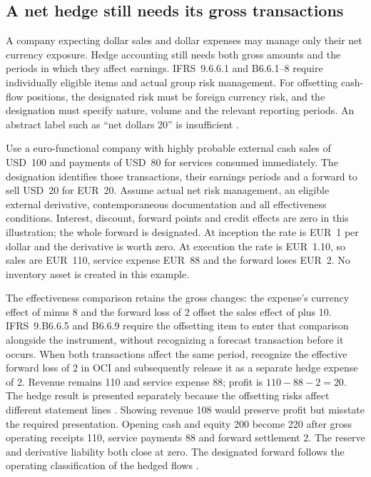 \subsection{A net hedge still needs its gross transactions}
\label{sec:net-hedge-timing}

A company expecting dollar sales and dollar expenses may manage only their
net currency exposure. Hedge accounting still needs both gross amounts and the
periods in which they affect earnings. IFRS~9.6.6.1 and B6.6.1--8 require
individually eligible items and actual group risk management. For offsetting
cash-flow positions, the designated risk must be foreign currency risk, and
the designation must specify nature, volume and the relevant reporting periods.
An abstract label such as ``net dollars 20'' is insufficient
\citep[IFRS~9.6.6.1--3, B6.6.1--8]{eu20231803}.

Use a euro-functional company with highly probable external cash sales of
USD~100 and payments of USD~80 for services consumed immediately. The
designation identifies those transactions, their earnings periods and a forward
to sell USD~20 for EUR~20. Assume actual net risk management, an eligible
external derivative, contemporaneous documentation and all effectiveness
conditions. Interest, discount, forward points and credit effects are zero in
this illustration; the whole forward is designated. At inception the rate is
EUR~1 per dollar and the derivative is worth zero. At execution the rate is
EUR~1.10, so sales are EUR~110, service expense EUR~88 and the forward loses
EUR~2. No inventory asset is created in this example.

The effectiveness comparison retains the gross changes: the expense's
currency effect of minus 8 and the forward loss of 2 offset the sales effect
of plus 10. IFRS~9.B6.6.5 and B6.6.9 require the offsetting item to enter
that comparison alongside the instrument, without recognizing a forecast
transaction before it occurs. When both transactions affect the same period,
recognize the effective forward loss of 2 in OCI and subsequently release it
as a separate hedge expense of 2. Revenue remains 110 and service expense 88;
profit is $110-88-2=20$. The hedge result is presented separately because the
offsetting risks affect different statement lines
\citep[IFRS~9.6.5.11, 6.6.4, B6.6.5, B6.6.9, B6.6.15]{eu20231803}.
Showing revenue 108 would preserve profit but misstate the required
presentation. Opening cash and equity 200 become 220 after gross operating
receipts 110, service payments 88 and forward settlement 2. The reserve and
derivative liability both close at zero. The designated forward follows the
operating classification of the hedged flows \citep[IAS~7.16]{eu20231803}.

